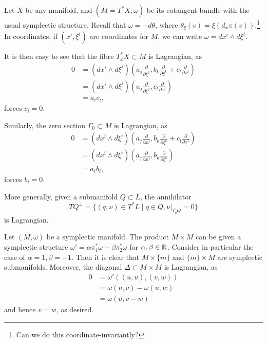 \documentclass{amsart}
\begin{document}
\begin{example}
    Let $X$ be any manifold, and $(M=T^*X,\omega)$ be its cotangent bundle with the usual symplectic
    structure. Recall that $\omega=-d\theta$, where $\theta_\xi(v)=\xi(d_x\pi(v))$.\footnote{Can we do
    this coordinate-invariantly?}
    In coordinates, if $(x^i,\xi^i)$ are coordinates for $M$, we can write 
    $\omega=dx^i\wedge d\xi^i$.

    It is then easy to see that the fibre $T_x^*X\subset M$ is Lagrangian, as 
    \begin{align*}
        0 &= (dx^i\wedge d\xi^i)\left( a_j\frac{\partial}{\partial\xi^j}, b_k\frac{\partial}{\partial\xi^k}+c_l\frac{\partial}{\partial x^l} \right)\\
        &= (dx^i\wedge d\xi^i)\left( a_j\frac{\partial}{\partial\xi^j},c_l\frac{\partial}{\partial x^l} \right)\\
        &= a_ic_i,
    \end{align*}
    forces $c_i=0$.

    Similarly, the zero section $\Gamma_0\subset M$ is Lagrangian, as
    \begin{align*}
        0 &= (dx^i\wedge d\xi^i)\left( a_j\frac{\partial}{\partial x^j}, b_k\frac{\partial}{\partial\xi^k}+c_l\frac{\partial}{\partial x^l} \right)\\
        &= (dx^i\wedge d\xi^i)\left( a_j\frac{\partial}{\partial x^j},b_k\frac{\partial}{\partial \xi^k} \right)\\
        &= a_ib_i,
    \end{align*}
    forces $b_i=0$.

    More generally, given a submanifold $Q\subset L$, the annihilator
    \begin{equation*}
        TQ^{\perp} = \{(q,\nu)\in T^*L \mid q\in Q, \nu|_{T_qQ}=0\}
    \end{equation*}
    is Lagrangian.
\end{example}

\begin{example}
    Let $(M,\omega)$ be a symplectic manifold. The product $M\times M$ can be given
    a symplectic structure $\omega'=\alpha\pi_1^*\omega+\beta\pi_2^*\omega$ for $\alpha,\beta\in\mathbb{R}$.
    Consider in particular the case of $\alpha=1,\beta=-1$. Then it is clear that $M\times\{m\}$
    and $\{m\}\times M$ are symplectic submanifolds. Moreover, the diagonal $\Delta\subset M\times M$
    is Lagrangian, as
    \begin{align*}
        0&=\omega'\left( (u,u), (v,w) \right)\\
        &=\omega(u,v)-\omega(u,w)\\
        &=\omega(u,v-w)
    \end{align*}
    and hence $v=w$, as desired.
\end{example}
\end{document}
